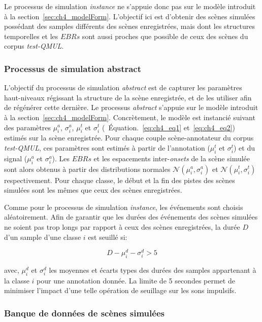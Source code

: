 Le processus de simulation \emph{instance} ne s'appuie donc pas sur le modèle introduit à la section~\ref{sec:ch4_modelForm}. L'objectif ici est d’obtenir des scènes simulées possédant des samples différents des scènes enregistrées, mais dont les structures temporelles et les $EBRs$ sont aussi proches que possible de ceux des scènes du corpus \emph{test-QMUL}.

\subsubsection{Processus de simulation abstract}
\label{sec:ch7_simuProcessAbstract}

L'objectif du processus de simulation \emph{abstract} est de capturer les paramètres haut-niveaux régissant la structure de la scène enregistrée, et de les utiliser afin de régénérer cette dernière. Le processus \emph{abstract} s'appuie sur le modèle introduit à la section~\ref{sec:ch4_modelForm}. Concrètement, le modèle est instancié suivant des paramètres $\mu_i^a$, $\sigma_i^a$, $\mu_i^t$ et $\sigma_i^t$ (\cf~Équation.~\ref{eq:ch4_eq1} et~\ref{eq:ch4_eq2}) estimés sur la scène enregistrée. Pour chaque couple scène-annotateur du corpus \emph{test-QMUL}, ces paramètres sont estimés à partir de l'annotation ($\mu_i^t$ et $\sigma_i^t$) et du signal ($\mu_i^a$ et $\sigma_i^a$). Les $EBRs$ et les espacements inter-\emph{onsets} de la scène simulée sont alors obtenus à partir des distributions normales $\mathcal{N}(\mu_i^a,\sigma_i^a)$ et $\mathcal{N}(\mu_i^t,\sigma_i^t)$ respectivement. Pour chaque classe, le début et la fin des pistes des scènes simulées sont les mêmes que ceux des scènes enregistrées.

Comme pour le processus de simulation \emph{instance}, les événements sont choisis aléatoirement. Afin de garantir que les durées des événements des scènes simulées ne soient pas trop longs par rapport à ceux des scènes enregistrées, la durée $D$ d'un sample d'une classe $i$ est seuillé si:

\begin{equation}
D-\mu_i^d-\sigma_i^d>5
\end{equation}

avec, $\mu_i^d$ et $\sigma_i^d$ les moyennes et écarts types des durées des samples appartenant à la classe $i$ pour une annotation donnée. La limite de 5 secondes permet de minimiser l'impact d'une telle opération de seuillage sur les sons impulsifs.

\subsubsection{Banque de données de scènes simulées}
\label{sec:ch7_datasetEtEbr}

